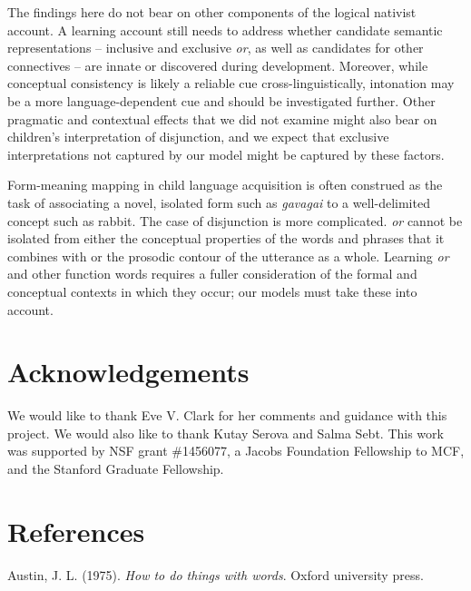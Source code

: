 \documentclass[10pt, letterpaper]{article}
\begin{document}
The findings here do not bear on other components of the logical
nativist account. A learning account still needs to address whether
candidate semantic representations -- inclusive and exclusive \emph{or},
as well as candidates for other connectives -- are innate or discovered
during development. Moreover, while conceptual consistency is likely a
reliable cue cross-linguistically, intonation may be a more
language-dependent cue and should be investigated further. Other
pragmatic and contextual effects that we did not examine might also bear
on children's interpretation of disjunction, and we expect that
exclusive interpretations not captured by our model might be captured by
these factors.

Form-meaning mapping in child language acquisition is often construed as
the task of associating a novel, isolated form such as \emph{gavagai} to
a well-delimited concept such as rabbit. The case of disjunction is more
complicated. \emph{or} cannot be isolated from either the conceptual
properties of the words and phrases that it combines with or the
prosodic contour of the utterance as a whole. Learning \emph{or} and
other function words requires a fuller consideration of the formal and
conceptual contexts in which they occur; our models must take these into
account.

\vspace{1em}
\vspace{1em}

\section{Acknowledgements}\label{acknowledgements}

We would like to thank Eve V. Clark for her comments and guidance with
this project. We would also like to thank Kutay Serova and Salma Sebt.
This work was supported by NSF grant \#1456077, a Jacobs Foundation
Fellowship to MCF, and the Stanford Graduate Fellowship.

\section{References}\label{references}

\setlength{\parindent}{-0.1in} \setlength{\leftskip}{0.125in} \noindent

\hypertarget{refs}{}
\hypertarget{ref-austin1975things}{}
Austin, J. L. (1975). \emph{How to do things with words}. Oxford
university press.
\end{document}
